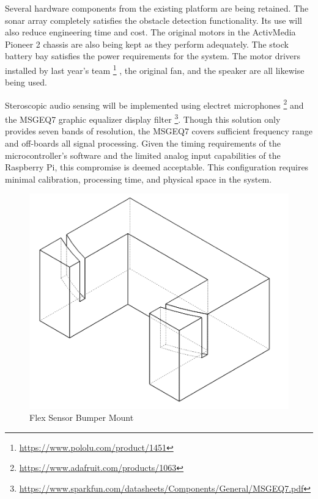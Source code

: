 \documentclass{article}
\begin{document}
    Several hardware components from the existing platform are being retained.
    The sonar array completely satisfies the obstacle detection functionality.
    Its use will also reduce engineering time and cost.
    The original motors in the ActivMedia Pioneer 2 chassis
    are also being kept as they perform adequately.
    The stock battery bay satisfies the power requirements for the system.
    The motor drivers installed by last year's team%
    \footnote{\url{https://www.pololu.com/product/1451}}
    , the original fan,
    and the speaker are all likewise being used.
    
    Steroscopic audio sensing will be implemented
    using electret microphones%
    \footnote{\url{https://www.adafruit.com/products/1063}}
    and the MSGEQ7 graphic equalizer display filter%
    \footnote{\url{https://www.sparkfun.com/datasheets/Components/General/MSGEQ7.pdf}}.
    Though this solution only provides seven bands of resolution,
    the MSGEQ7 covers sufficient frequency range
    and off-boards all signal processing.
    Given the timing requirements of the microcontroller's software
    and the limited analog input capabilities of the Raspberry Pi,
    this compromise is deemed acceptable.
    This configuration requires minimal calibration, processing time,
    and physical space in the system.
    
    \begin{figure}[h!tb]
        \centering
        \includegraphics[width=.75\textwidth]{mount.png}
        \caption{Flex Sensor Bumper Mount}
        \label{fig:mount}
    \end{figure}
    
\end{document}
